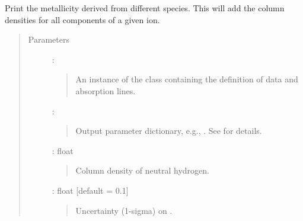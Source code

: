 \documentclass[letterpaper,10pt,english]{sphinxmanual}
\begin{document}
\begin{fulllineitems}
\label{\detokenize{api:output.print_metallicity}}
Print the metallicity derived from different species.
This will add the column densities for all components of a given ion.
\begin{quote}\begin{description}
\item[{Parameters}] \leavevmode
{} : {\hyperref[\detokenize{api:VoigtFit.DataSet}]{}}
\begin{quote}

An instance of the {\hyperref[\detokenize{api:VoigtFit.DataSet}]{}} class containing
the definition of data and absorption lines.
\end{quote}

 : 
\begin{quote}

Output parameter dictionary, e.g., .
See  for details.
\end{quote}

 : float
\begin{quote}

Column density of neutral hydrogen.
\end{quote}

 : float   {[}default = 0.1{]}
\begin{quote}

Uncertainty (1-sigma) on .
\end{quote}


\end{description}\end{quote}

\end{fulllineitems}

\end{document}
